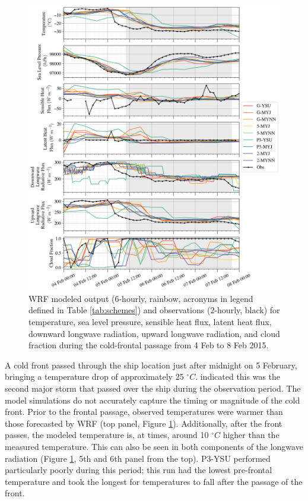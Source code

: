 \begin{figure}[p]
    \centering
    \includegraphics[width=1\linewidth]{figures/chapter3/wrf_case1.png}
    \caption[Polar WRF Case 1 - Winter cold front (5 Feb 2015) timeseries]{WRF modeled output (6-hourly, rainbow, acronyms in legend defined in Table \ref{tab:schemes}) and observations (2-hourly, black) for temperature, sea level pressure, sensible heat flux, latent heat flux, downward longwave radiation, upward longwave radiation, and cloud fraction during the cold-frontal passage from 4 Feb to 8 Feb 2015.}
    \label{fig:wrf_case1}
\end{figure}

A cold front passed through the ship location just after midnight on 5 February, bringing a temperature drop of approximately 25 $^{\circ} C$. \citet{cohen:2017} indicated this was the second major storm that passed over the ship during the observation period. The model simulations do not accurately capture the timing or magnitude of the cold front. Prior to the frontal passage, observed temperatures were warmer than those forecasted by WRF (top panel, Figure \ref{fig:wrf_case1}). Additionally, after the front passes, the modeled temperature is, at times, around 10 $^{\circ} C$ higher than the measured temperature. This can also be seen in both components of the longwave radiation (Figure \ref{fig:wrf_case1}, 5th and 6th panel from the top). P3-YSU performed particularly poorly during this period; this run had the lowest pre-frontal temperature and took the longest for temperatures to fall after the passage of the front.


